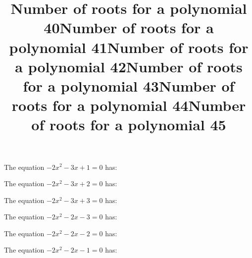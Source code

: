 \documentclass{article}
\begin{document}
\begin{category}
\begin{question}[multichoice]

\end{question}
\begin{question}[multichoice]
\title{Number of roots for a polynomial 40}
The equation $- 2 x^{2} - 3 x + 1=0$ has:


\end{question}
\begin{question}[multichoice]
\title{Number of roots for a polynomial 41}
The equation $- 2 x^{2} - 3 x + 2=0$ has:


\end{question}
\begin{question}[multichoice]
\title{Number of roots for a polynomial 42}
The equation $- 2 x^{2} - 3 x + 3=0$ has:


\end{question}
\begin{question}[multichoice]
\title{Number of roots for a polynomial 43}
The equation $- 2 x^{2} - 2 x - 3=0$ has:


\end{question}
\begin{question}[multichoice]
\title{Number of roots for a polynomial 44}
The equation $- 2 x^{2} - 2 x - 2=0$ has:


\end{question}
\begin{question}[multichoice]
\title{Number of roots for a polynomial 45}
The equation $- 2 x^{2} - 2 x - 1=0$ has:



\end{question}
\end{category}
\end{document}
